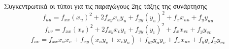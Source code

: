 \begin{rem}
  Συγκεντρωτικά οι τύποι για τις παραγώγους 2ης τάξης της συνάρτησης 
  \[
    f_{uu}= f_{xx}(x_{u})^{2}+ 2f_{xy}x_{u}y_{u} + f_{yy}(y_{u})^{2} + f_{x}x_{uu} + 
    f_{y}y_{uu} 
  \] 
  \[
    f_{vv}= f_{xx}(x_{v})^{2}+ 2f_{xy}x_{v}y_{v} + f_{yy}(y_{v})^{2} + f_{x}x_{vv} + 
    f_{y}y_{vv} 
  \]
  \[
    f_{uv}= f_{xx}x_{u}x_{v}+ f_{xy}(x_{u}y_{v} + x_{v}y_{u}) + 
    f_{yy}y_{u}y_{v} + f_{x}x_{uv} + f_{y}y_{v} 
    f_{y}y_{vv} 
  \]
\end{rem}



